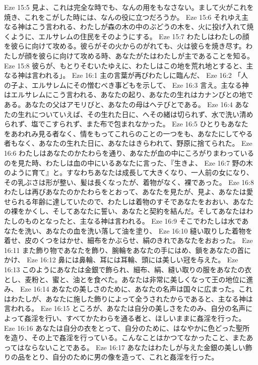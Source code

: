 Eze 15:5  見よ、これは完全な時でも、なんの用をもなさない。まして火がこれを焼き、これをこがした時には、なんの役に立つだろうか。
Eze 15:6  それゆえ主なる神はこう言われる、わたしが森の木の中のぶどうの木を、火に投げ入れて焼くように、エルサレムの住民をそのようにする。
Eze 15:7  わたしはわたしの顔を彼らに向けて攻める。彼らがその火からのがれても、火は彼らを焼き尽す。わたしが顔を彼らに向けて攻める時、あなたがたはわたしが主であることを知る。
Eze 15:8  彼らが、もとりそむいたゆえに、わたしはこの地を荒れ地とすると、主なる神は言われる」。
Eze 16:1  主の言葉が再びわたしに臨んだ、
Eze 16:2  「人の子よ、エルサレムにその憎むべき事どもを示して、
Eze 16:3  言え。主なる神はエルサレムにこう言われる、あなたの起り、あなたの生れはカナンびとの地である。あなたの父はアモリびと、あなたの母はヘテびとである。
Eze 16:4  あなたの生れについていえば、その生れた日に、へその緒は切られず、水で洗い清められず、塩でこすられず、また布で包まれなかった。
Eze 16:5  ひとりもあなたをあわれみ見る者なく、情をもってこれらのことの一つをも、あなたにしてやる者もなく、あなたの生れた日に、あなたはきらわれて、野原に捨てられた。
Eze 16:6  わたしはあなたのかたわらを通り、あなたが血の中にころがりまわっているのを見た時、わたしは血の中にいるあなたに言った、『生きよ、
Eze 16:7  野の木のように育て』と。すなわちあなたは成長して大きくなり、一人前の女になり、その乳ぶさは形が整い、髪は長くなったが、着物がなく、裸であった。
Eze 16:8  わたしは再びあなたのかたわらをとおって、あなたを見たが、見よ、あなたは愛せられる年齢に達していたので、わたしは着物のすそであなたをおおい、あなたの裸をかくし、そしてあなたに誓い、あなたと契約を結んだ。そしてあなたはわたしのものとなったと、主なる神は言われる。
Eze 16:9  そこでわたしは水であなたを洗い、あなたの血を洗い落して油を塗り、
Eze 16:10  縫い取りした着物を着せ、皮のくつをはかせ、細布をかぶらせ、絹のきれであなたをおおった。
Eze 16:11  また飾り物であなたを飾り、腕輪をあなたの手にはめ、鎖をあなたの首にかけ、
Eze 16:12  鼻には鼻輪、耳には耳輪、頭には美しい冠を与えた。
Eze 16:13  このようにあなたは金銀で飾られ、細布、絹、縫い取りの服をあなたの衣とし、麦粉と、蜜と、油とを食べた。あなたは非常に美しくなって王の地位に進み、
Eze 16:14  あなたの美しさのために、あなたの名声は国々に広まった。これはわたしが、あなたに施した飾りによって全うされたからであると、主なる神は言われる。
Eze 16:15  ところが、あなたは自分の美しさをたのみ、自分の名声によって姦淫を行い、すべてかたわらを通る者と、ほしいままに姦淫を行った。
Eze 16:16  あなたは自分の衣をとって、自分のために、はなやかに色どった聖所を造り、その上で姦淫を行っている。こんなことはかつてなかったこと、またあってはならないことである。
Eze 16:17  あなたはわたしが与えた金銀の美しい飾りの品をとり、自分のために男の像を造って、これと姦淫を行った。
